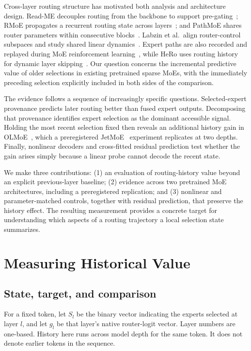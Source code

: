\documentclass[10pt,letterpaper,twocolumn]{yalearxiv}
\begin{document}
Cross-layer routing structure has motivated both analysis and architecture design. Read-ME decouples routing from the backbone to support pre-gating~\citep{readme}; RMoE propagates a recurrent routing state across layers~\citep{rmoe}; and PathMoE shares router parameters within consecutive blocks~\citep{pathmoe}. Labzin et al.\ align router-control subspaces and study shared linear dynamics~\citep{geometry}. Expert paths are also recorded and replayed during MoE reinforcement learning~\citep{esrl}, while HeRo uses routing history for dynamic layer skipping~\citep{hero}. Our question concerns the incremental predictive value of older selections in existing pretrained sparse MoEs, with the immediately preceding selection explicitly included in both sides of the comparison.

The evidence follows a sequence of increasingly specific questions. Selected-expert provenance predicts later routing better than fused expert outputs. Decomposing that provenance identifies expert selection as the dominant accessible signal. Holding the most recent selection fixed then reveals an additional history gain in OLMoE~\citep{olmoe}, which a preregistered JetMoE~\citep{jetmoe} experiment replicates at two depths. Finally, nonlinear decoders and cross-fitted residual prediction test whether the gain arises simply because a linear probe cannot decode the recent state.

We make three contributions: (1) an evaluation of routing-history value beyond an explicit previous-layer baseline; (2) evidence across two pretrained MoE architectures, including a preregistered replication; and (3) nonlinear and parameter-matched controls, together with residual prediction, that preserve the history effect. The resulting measurement provides a concrete target for understanding which aspects of a routing trajectory a local selection state summarizes.



\section{Measuring Historical Value}
\subsection{State, target, and comparison}
For a fixed token, let $S_l$ be the binary vector indicating the experts selected at layer $l$, and let $g_l$ be that layer's native router-logit vector. Layer numbers are one-based. History here runs across model depth for the same token. It does not denote earlier tokens in the sequence.
\end{document}

